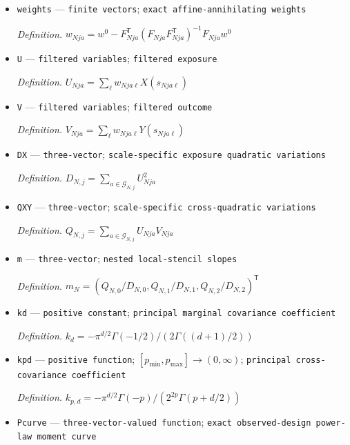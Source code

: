 \documentclass{article}
\begin{document}
\begin{itemize}
  \par\smallskip\noindent\emph{Definition.} \(F_{Nja}\) has rows equal to one and the normalized selected-site coordinates in stencil \(a\in\mathcal G_{N,j}\)
  \item \texttt{weights} --- \texttt{finite vectors}; \texttt{exact affine-\allowbreak{}annihilating weights}
  \par\smallskip\noindent\emph{Definition.} \(w_{Nja}=w^0-F_{Nja}^{\mathsf T}(F_{Nja}F_{Nja}^{\mathsf T})^{-1}F_{Nja}w^0\)
  \item \texttt{U} --- \texttt{filtered variables}; \texttt{filtered exposure}
  \par\smallskip\noindent\emph{Definition.} \(U_{Nja}=\sum_{\ell}w_{Nja\ell}X(s_{Nja\ell})\)
  \item \texttt{V} --- \texttt{filtered variables}; \texttt{filtered outcome}
  \par\smallskip\noindent\emph{Definition.} \(V_{Nja}=\sum_{\ell}w_{Nja\ell}Y(s_{Nja\ell})\)
  \item \texttt{DX} --- \texttt{three-\allowbreak{}vector}; \texttt{scale-\allowbreak{}specific exposure quadratic variations}
  \par\smallskip\noindent\emph{Definition.} \(D_{N,j}=\sum_{a\in\mathcal G_{N,j}}U_{Nja}^2\)
  \item \texttt{QXY} --- \texttt{three-\allowbreak{}vector}; \texttt{scale-\allowbreak{}specific cross-\allowbreak{}quadratic variations}
  \par\smallskip\noindent\emph{Definition.} \(Q_{N,j}=\sum_{a\in\mathcal G_{N,j}}U_{Nja}V_{Nja}\)
  \item \texttt{m} --- \texttt{three-\allowbreak{}vector}; \texttt{nested local-\allowbreak{}stencil slopes}
  \par\smallskip\noindent\emph{Definition.} \(m_N=(Q_{N,0}/D_{N,0},Q_{N,1}/D_{N,1},Q_{N,2}/D_{N,2})^{\mathsf T}\)
  \item \texttt{kd} --- \texttt{positive constant}; \texttt{principal marginal covariance coefficient}
  \par\smallskip\noindent\emph{Definition.} \(k_d=-\pi^{d/2}\Gamma(-1/2)/(2\Gamma((d+1)/2))\)
  \item \texttt{kpd} --- \texttt{positive function}; \([p_{\min},p_{\max}]\to(0,\infty)\); \texttt{principal cross-\allowbreak{}covariance coefficient}
  \par\smallskip\noindent\emph{Definition.} \(k_{p,d}=-\pi^{d/2}\Gamma(-p)/(2^{2p}\Gamma(p+d/2))\)
  \item \texttt{Pcurve} --- \texttt{three-\allowbreak{}vector-\allowbreak{}valued function}; \texttt{exact observed-\allowbreak{}design power-\allowbreak{}law moment curve}

\end{itemize}
\end{document}
